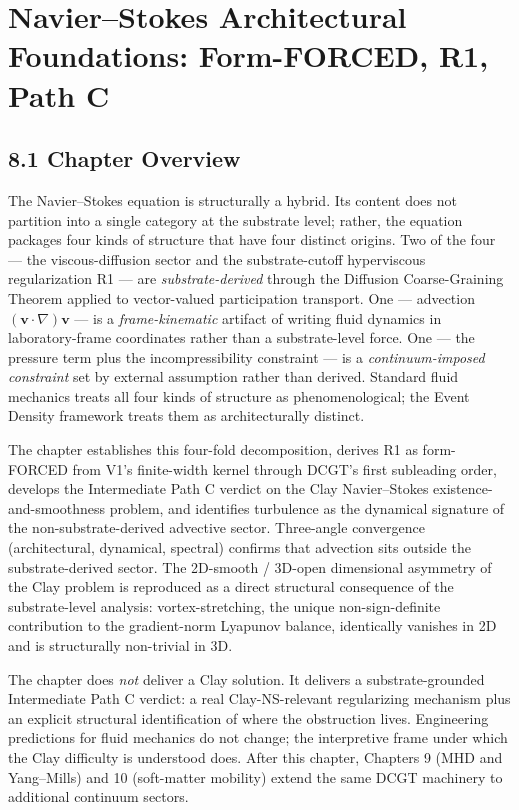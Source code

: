 \documentclass[11pt]{book}
\begin{document}
\newpage


\chapter{Navier–Stokes Architectural Foundations: Form-FORCED, R1, Path C}
\label{chap:8}

\section{8.1 Chapter Overview}

The Navier–Stokes equation is structurally a hybrid. Its content does not partition into a single category at the substrate level; rather, the equation packages four kinds of structure that have four distinct origins. Two of the four — the viscous-diffusion sector and the substrate-cutoff hyperviscous regularization R1 — are \textit{substrate-derived} through the Diffusion Coarse-Graining Theorem applied to vector-valued participation transport. One — advection $(\mathbf{v}\cdot\nabla)\mathbf{v}$ — is a \textit{frame-kinematic} artifact of writing fluid dynamics in laboratory-frame coordinates rather than a substrate-level force. One — the pressure term plus the incompressibility constraint — is a \textit{continuum-imposed constraint} set by external assumption rather than derived. Standard fluid mechanics treats all four kinds of structure as phenomenological; the Event Density framework treats them as architecturally distinct.

The chapter establishes this four-fold decomposition, derives R1 as form-FORCED from V1's finite-width kernel through DCGT's first subleading order, develops the Intermediate Path C verdict on the Clay Navier–Stokes existence-and-smoothness problem, and identifies turbulence as the dynamical signature of the non-substrate-derived advective sector. Three-angle convergence (architectural, dynamical, spectral) confirms that advection sits outside the substrate-derived sector. The 2D-smooth / 3D-open dimensional asymmetry of the Clay problem is reproduced as a direct structural consequence of the substrate-level analysis: vortex-stretching, the unique non-sign-definite contribution to the gradient-norm Lyapunov balance, identically vanishes in 2D and is structurally non-trivial in 3D.

The chapter does \textit{not} deliver a Clay solution. It delivers a substrate-grounded Intermediate Path C verdict: a real Clay-NS-relevant regularizing mechanism plus an explicit structural identification of where the obstruction lives. Engineering predictions for fluid mechanics do not change; the interpretive frame under which the Clay difficulty is understood does. After this chapter, Chapters 9 (MHD and Yang–Mills) and 10 (soft-matter mobility) extend the same DCGT machinery to additional continuum sectors.
\end{document}

